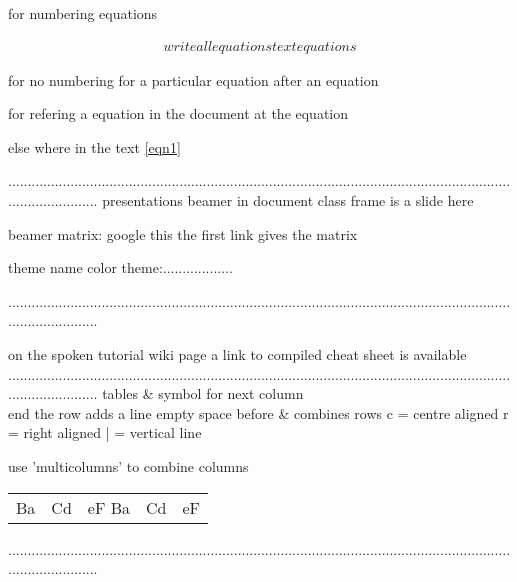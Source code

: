 for numbering equations

\begin{align}
write all equations
text
equations
\end{align}

for no numbering for a particular equation
after an equation
\nonumber

for refering a equation in the document
at the equation\label{eqn1}

else where in the text \ref{eqn1}

........................................................................................................................................................
presentations beamer in document class
frame is a slide here

beamer matrix: google this
the first link gives the matrix

				theme name
color theme:..................

........................................................................................................................................................

on the spoken tutorial wiki page a link to compiled cheat sheet is available
........................................................................................................................................................
tables
& symbol for next column
\\ end the row
\hline adds a line
empty space before & combines rows
c = centre aligned
r = right aligned
| = vertical line

use 'multicolumns' to combine columns 

\begin{tabular}{ccccc} %
\hline
Ba & Cd & eF %
Ba & Cd & eF %
\hline
\end{tabular}
........................................................................................................................................................





